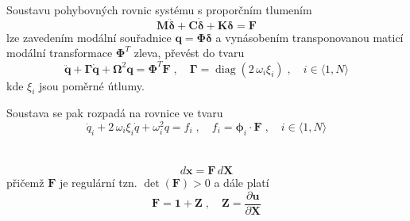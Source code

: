 \documentclass{article}
\begin{document}
	Soustavu pohybovných rovnic systému s proporčním tlumením
	\begin{equation}
		\bm{M}\bm{\ddot{\delta}} + \bm{C}\bm{\dot{\delta}} + \bm{K}\bm{\delta} = \bm{F}
	\end{equation}
	lze zavedením modální souřadnice $\bm{q} = \bm{\Phi}\bm{\delta}$ a vynásobením transponovanou maticí modální transformace $\bm{\Phi}^T$ zleva, převést do tvaru
	\begin{equation}
		\bm{\ddot{q}} + \bm{\Gamma}\bm{\dot{q}} + \bm{\Omega}^2 \bm{q} = \bm{\Phi}^T \bm{F}
		\;,\quad 
		\bm{\Gamma} = \operatorname{diag}(2\,\omega_i\xi_i) \;,\quad i \in \langle 1,N \rangle
	\end{equation}
	kde $\xi_i$ jsou poměrné útlumy.

	Soustava se pak rozpadá na rovnice ve tvaru
	\begin{equation}
		\ddot{q}_i + 2\,\omega_i\xi_i \dot{q} + \omega_i^2 q = f_i
		\;,\quad 
		f_i = \bm{\phi}_i \cdot \bm{F}
		\;,\quad 
		i \in \langle 1,N \rangle
	\end{equation}

	\section{}
	\begin{equation}
		d\bm{x} = \bm{F} \, d\bm{X}
	\end{equation}
	přičemž $\bm{F}$ je regulární tzn. $\det(\bm{F}) > 0$ a dále platí
	\begin{equation}
	\bm{F} = \bm{1} + \bm{Z}
	\;,\quad 
	\bm{Z} = \frac{\partial \bm{u}}{\partial \bm{X}}
	\end{equation}
\end{document}
